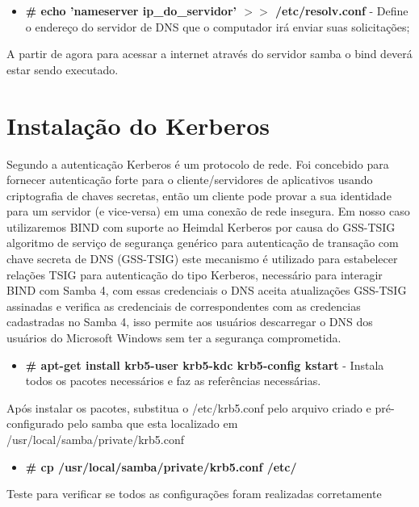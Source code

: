 \begin{itemize}
	\item \textbf{\# echo 'nameserver ip\_do\_servidor' $>$$>$ /etc/resolv.conf} - Define o endereço do servidor de DNS que o computador irá enviar suas solicitações;
\end{itemize}

A partir de agora para acessar a internet através do servidor samba o bind deverá estar sendo executado.

\section{Instalação do Kerberos}

Segundo \cite{HEIMDAL} a autenticação Kerberos é um protocolo de rede. Foi concebido para fornecer autenticação forte para o cliente/servidores de aplicativos usando criptografia de chaves secretas, então um cliente pode provar a sua identidade para um servidor (e vice-versa) em uma conexão de rede insegura.
Em nosso caso utilizaremos BIND com suporte ao Heimdal Kerberos por causa do GSS-TSIG algoritmo de serviço de segurança genérico para autenticação de transação com chave secreta de DNS (GSS-TSIG) este mecanismo é utilizado para estabelecer relações TSIG para autenticação do tipo Kerberos, necessário para interagir BIND com Samba 4, com essas credenciais o DNS aceita atualizações GSS-TSIG assinadas e verifica as credenciais de correspondentes com as credencias cadastradas no Samba 4, isso permite aos usuários descarregar o DNS dos usuários do Microsoft Windows sem ter a segurança comprometida.

\begin{itemize}
	\item \textbf{\# apt-get install krb5-user krb5-kdc krb5-config kstart} - Instala todos os pacotes necessários e faz as referências necessárias.
\end{itemize}

Após instalar os pacotes, substitua o /etc/krb5.conf pelo arquivo criado e pré-configurado pelo samba que esta localizado em /usr/local/samba/private/krb5.conf

\begin{itemize}
	\item \textbf{\# cp /usr/local/samba/private/krb5.conf  /etc/}
\end{itemize}

Teste para verificar se todos as configurações foram realizadas corretamente

